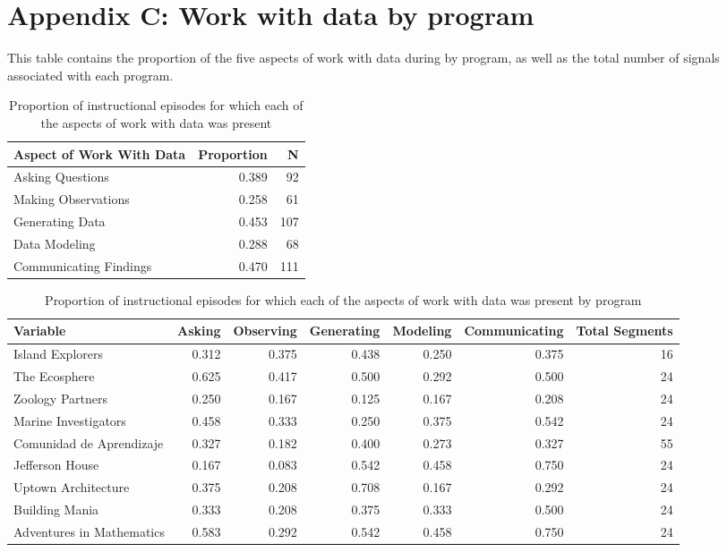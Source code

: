\documentclass[]{msu-thesis}
\theoremstyle{definition}
\theoremstyle{definition}
\theoremstyle{definition}
\theoremstyle{remark}
\begin{document}
\section{Appendix C: Work with data by
program}\label{appendix-c-work-with-data-by-program}

This table contains the proportion of the five aspects of work with data
during by program, as well as the total number of signals associated
with each program.

\begin{table}

\caption{\label{tab:unnamed-chunk-18}Proportion of instructional episodes for which each of the aspects of work with data was present}
\centering
\begin{tabular}[t]{lrr}
\toprule
Aspect of Work With Data & Proportion & N\\
\midrule
Asking Questions & 0.389 & 92\\
Making Observations & 0.258 & 61\\
Generating Data & 0.453 & 107\\
Data Modeling & 0.288 & 68\\
Communicating Findings & 0.470 & 111\\
\bottomrule
\end{tabular}
\end{table}

\begin{landscape}\begin{table}

\caption{\label{tab:unnamed-chunk-18}Proportion of instructional episodes for which each of the aspects of work with data was present by program}
\centering
\begin{tabular}[t]{lrrrrrr}
\toprule
Variable & Asking & Observing & Generating & Modeling & Communicating & Total Segments\\
\midrule
Island Explorers & 0.312 & 0.375 & 0.438 & 0.250 & 0.375 & 16\\
The Ecosphere & 0.625 & 0.417 & 0.500 & 0.292 & 0.500 & 24\\
Zoology Partners & 0.250 & 0.167 & 0.125 & 0.167 & 0.208 & 24\\
Marine Investigators & 0.458 & 0.333 & 0.250 & 0.375 & 0.542 & 24\\
Comunidad de Aprendizaje & 0.327 & 0.182 & 0.400 & 0.273 & 0.327 & 55\\
Jefferson House & 0.167 & 0.083 & 0.542 & 0.458 & 0.750 & 24\\
Uptown Architecture & 0.375 & 0.208 & 0.708 & 0.167 & 0.292 & 24\\
Building Mania & 0.333 & 0.208 & 0.375 & 0.333 & 0.500 & 24\\
Adventures in Mathematics & 0.583 & 0.292 & 0.542 & 0.458 & 0.750 & 24\\
\bottomrule
\end{tabular}
\end{table}
\end{landscape}
\end{document}
